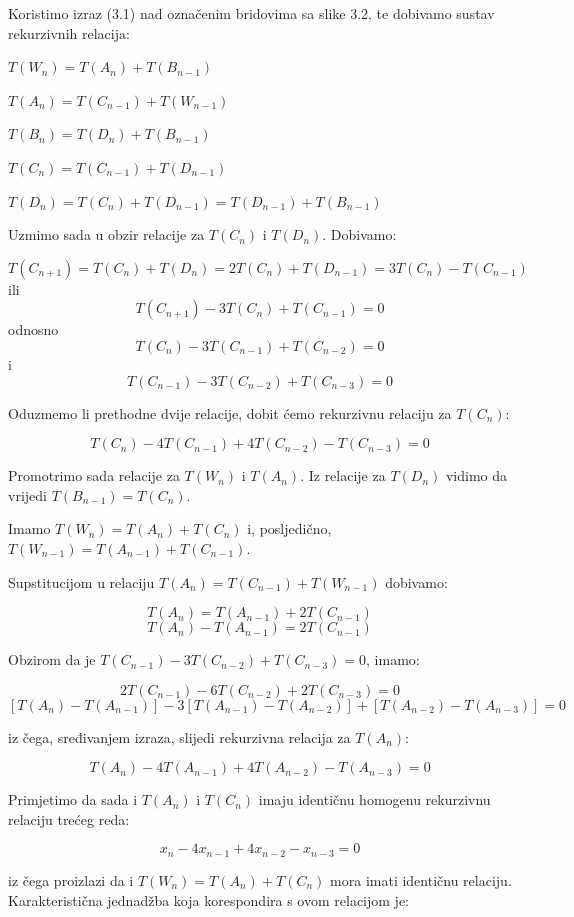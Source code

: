 \documentclass[times, utf8, zavrsni]{fer}
\begin{document}
\newpage

Koristimo izraz (3.1) nad označenim bridovima sa slike 3.2, te dobivamo sustav rekurzivnih relacija:

$T(W_n) = T(A_n) + T(B_{n - 1})$

$T(A_n) = T(C_{n - 1}) + T(W_{n - 1})$

$T(B_n) = T(D_n) + T(B_{n - 1})$

$T(C_n) = T(C_{n - 1}) + T(D_{n - 1})$

$T(D_n) = T(C_n) + T(D_{n - 1}) = T(D_{n - 1}) + T(B_{n - 1})$

Uzmimo sada u obzir relacije za $T(C_n)$ i $T(D_n)$. Dobivamo:

\[T(C_{n + 1}) = T(C_n) + T(D_n) = 2T(C_n) + T(D_{n - 1}) = 3T(C_n) - T(C_{n - 1})\]
ili 
\[T(C_{n + 1}) - 3T(C_n) + T(C_{n - 1}) = 0\]
odnosno
\[T(C_n) - 3T(C_{n - 1}) + T(C_{n - 2}) = 0\] i
\[T(C_{n-1}) - 3T(C_{n - 2}) + T(C_{n - 3}) = 0\]

Oduzmemo li prethodne dvije relacije, dobit ćemo rekurzivnu relaciju za $T(C_n)$:

\[T(C_n) - 4T(C_{n - 1}) + 4T(C_{n - 2}) - T(C_{n - 3}) = 0\]

Promotrimo sada relacije za $T(W_n)$ i $T(A_n)$. Iz relacije za $T(D_n)$ vidimo da vrijedi $T(B_{n -1}) = T(C_n)$. 

Imamo $T(W_n) = T(A_n) + T(C_n)$ i, posljedično, $T(W_{n - 1}) = T(A_{n - 1}) + T(C_{n - 1})$.

Supstitucijom u relaciju $T(A_n) = T(C_{n - 1}) + T(W_{n - 1})$ dobivamo:

\[T(A_n) = T(A_{n - 1}) + 2T(C_{n - 1})\]
\[T(A_n) - T(A_{n - 1}) = 2T(C_{n - 1})\]

Obzirom da je $T(C_{n - 1}) - 3T(C_{n - 2}) + T(C_{n - 3}) = 0$, imamo:

\[2T(C_{n - 1}) - 6T(C_{n - 2}) + 2T(C_{n - 3}) = 0\]
\[[T(A_n) - T(A_{n - 1})] - 3[T(A_{n - 1}) - T(A_{n - 2})] + [T(A_{n - 2}) - T(A_{n - 3})] = 0\]

iz čega, sređivanjem izraza, slijedi rekurzivna relacija za $T(A_n)$:

\[T(A_n) - 4T(A_{n - 1}) + 4T(A_{n - 2}) - T(A_{n - 3}) = 0\]

Primjetimo da sada i $T(A_n)$ i $T(C_n)$ imaju identičnu homogenu rekurzivnu relaciju trećeg reda:

\[x_n - 4x_{n - 1} + 4x_{n - 2} - x_{n - 3} = 0\]

iz čega proizlazi da i $T(W_n) = T(A_n) + T(C_n)$ mora imati identičnu relaciju. Karakteristična jednadžba koja korespondira s ovom relacijom je:
\end{document}

